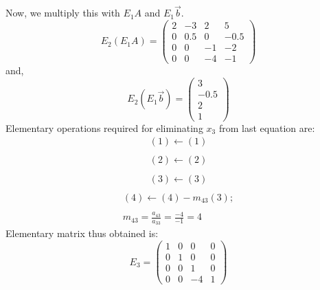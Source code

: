 \documentclass[12pt, oneside,table]{report}
\newcommand{\?}{\stackrel{?}{=}}
\theoremstyle{definition}
\begin{document}
Now, we multiply this with $E_{1}A$ and $E_{1}\overrightarrow{b}$.
\begin{equation}
    E_{2}\left(E_{1}A\right)=
    \begin{pmatrix}
    2&-3&2&5\\
    0&0.5&0&-0.5\\
    0&0&-1&-2\\
    0&0&-4&-1
    \end{pmatrix}
\end{equation}
and,
\begin{equation}
    E_{2}\left(E_{1}\overrightarrow{b}\right)=
    \begin{pmatrix}
    3\\
    -0.5\\
    2\\
    1
    \end{pmatrix}
\end{equation}
Elementary operations required for eliminating $x_{3}$ from last equation are:
\begin{equation}
\begin{matrix}
    \left(1\right) \longleftarrow \left(1\right) \\
    
    
    \end{matrix}
\end{equation}
\begin{equation}
\begin{matrix}
    \left(2\right) \longleftarrow \left(2\right)\\
    \end{matrix}
\end{equation}
\begin{equation}
\begin{matrix}
    \left(3\right) \longleftarrow \left(3\right) \\
    
    \end{matrix}
\end{equation}
\begin{equation}
\begin{matrix}
    \left(4\right) \longleftarrow \left(4\right) - m_{43}\left(3\right);\\
    \\
    m_{43} = \frac{a_{43}}{a_{33}}=\frac{-4}{-1}=4
    \end{matrix}
\end{equation}
Elementary matrix thus obtained is:
\begin{equation}
    E_{3}=\begin{pmatrix}
    1&0&0&0\\
    0&1&0&0\\
    0&0&1&0\\
    0&0&-4&1
    \end{pmatrix}
\end{equation}
\end{document}

